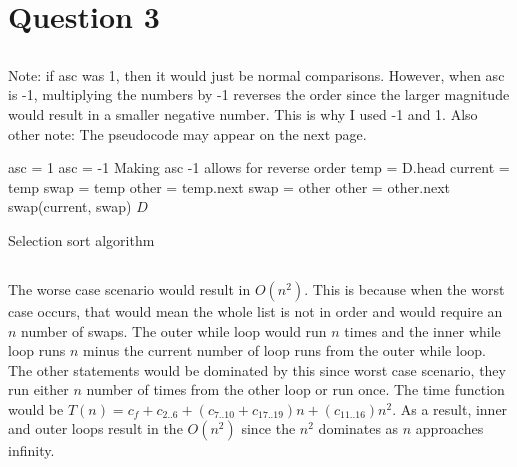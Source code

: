 \documentclass{article}
\begin{document}
\section{Question 3}
    \subsection{}
        Note: if asc was 1, then it would just be normal comparisons. However, when asc is -1, multiplying the numbers by -1 reverses the order since the larger magnitude would result in a smaller negative number. This is why I used -1 and 1.
        Also other note: The pseudocode may appear on the next page. 
        \begin{algorithm}
        \begin{algorithmic}[1]
        		 
        		\State asc = 1
        		    \State asc = -1 \Comment Making asc -1 allows for reverse order
        		\EndIf
        		\State temp = D.head
        		    \State current = temp
        		    \State swap = temp
        		    \State other = temp.next
                            \State swap = other
                        \EndIf
                        \State other = other.next
        		    \EndWhile
                        \State swap(current, swap)
                    \EndIf
        		\EndWhile
        		\State \Return $D$
        		\EndProcedure
        	\end{algorithmic}
        	\caption{Selection sort algorithm}
        \end{algorithm}
    \subsection{}
        The worse case scenario would result in $O(n^2)$. This is because when the worst case occurs, that would mean the whole list is not in order and would require an $n$ number of swaps. The outer while loop would run $n$ times and the inner while loop runs $n$ minus the current number of loop runs from the outer while loop. The other statements would be dominated by this since worst case scenario, they run either $n$ number of times from the other loop or run once. The time function would be $T(n) = c_f + c_{2..6} + (c_{7..10} + c_{17..19})n + (c_{11..16})n^2$. As a result, inner and outer loops result in the $O(n^2)$ since the $n^2$ dominates as $n$ approaches infinity. 
\end{document}
